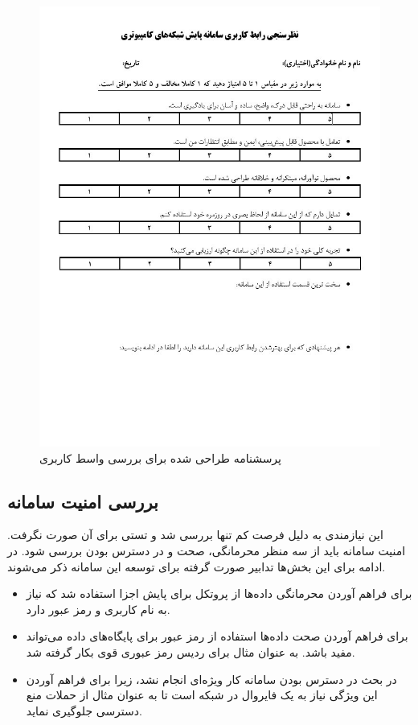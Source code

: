 \begin{figure}[!h]
    \centering\includegraphics[scale=.90]{./survey}
    \caption{پرسشنامه طراحی شده برای بررسی واسط کاربری}\label{fig.57}
\end{figure}

\cleardoublepage

\subsection{بررسی امنیت سامانه}

این نیازمندی به دلیل فرصت کم تنها بررسی شد و تستی برای آن صورت نگرفت. امنیت سامانه باید از سه منظر محرمانگی، صحت و در دسترس بودن بررسی شود. در ادامه برای این بخش‌ها تدابیر صورت گرفته برای توسعه این سامانه ذکر می‌شوند.

\begin{itemize}
    \item برای فراهم آوردن محرمانگی داده‌ها از پروتکل  برای پایش اجزا استفاده شد که نیاز به نام کاربری و رمز عبور دارد.
    \item برای فراهم آوردن صحت داده‌ها استفاده از رمز عبور برای پایگاه‌های داده می‌تواند مفید باشد. به عنوان مثال برای ردیس رمز عبوری قوی بکار گرفته شد.
    \item در بحث در دسترس بودن سامانه کار ویژه‌ای انجام نشد، زیرا برای فراهم آوردن این ویژگی نیاز به یک فایروال در شبکه است تا به عنوان مثال از حملات منع دسترسی جلوگیری نماید. 
\end{itemize}